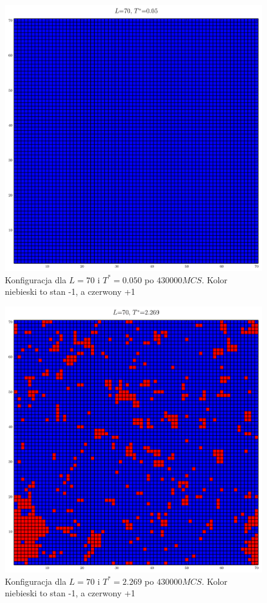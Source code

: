 \documentclass[11pt]{article}
\begin{document}
\begin{figure}
    \centering
    \includegraphics[width=\textwidth]{lattice_L70_T0.png}
    \caption{Konfiguracja dla $L=70$ i $T^* = 0.050$ po $430 000 MCS$. 
    Kolor niebieski to stan -1, a czerwony +1}
\end{figure}
\begin{figure}
    \centering
    \includegraphics[width=\textwidth]{lattice_L70_T2.png}
    \caption{Konfiguracja dla $L=70$ i $T^* = 2.269$ po $430 000 MCS$. 
    Kolor niebieski to stan -1, a czerwony +1}
\end{figure}
\end{document}
